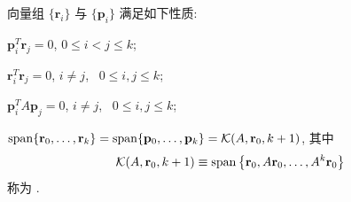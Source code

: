 \begin{theorem}
\label{thm:6-3}
向量组 $\{\mathbf{r}_i\}$ 与 $\{\mathbf{p}_i\}$ 满足如下性质:
\begin{parenlist}
  \item $\mathbf{p}_i^T\mathbf{r}_j=0$, \quad $0\leqslant i<j\leqslant k$;
  \item $\mathbf{r}_i^T\mathbf{r}_j=0$, \quad $i\neq j$, \ $0\leqslant i,j\leqslant k$;
  \item $\mathbf{p}_i^TA\mathbf{p}_j=0$, \quad $i\neq j$, \ $0\leqslant i,j\leqslant k$;
  \item $\operatorname{span}\{\mathbf{r}_0,\ldots,\mathbf{r}_k\}
        =\operatorname{span}\{\mathbf{p}_0,\ldots,\mathbf{p}_k\}
        =\mathcal{K}(A,\mathbf{r}_0,k+1)$, 其中
    \[
      \mathcal{K}(A,\mathbf{r}_0,k+1)
      \equiv\operatorname{span}\left\{\mathbf{r}_0,A\mathbf{r}_0,\ldots,A^k\mathbf{r}_0\right\}
    \]
    称为 .
\end{parenlist}
\end{theorem}

